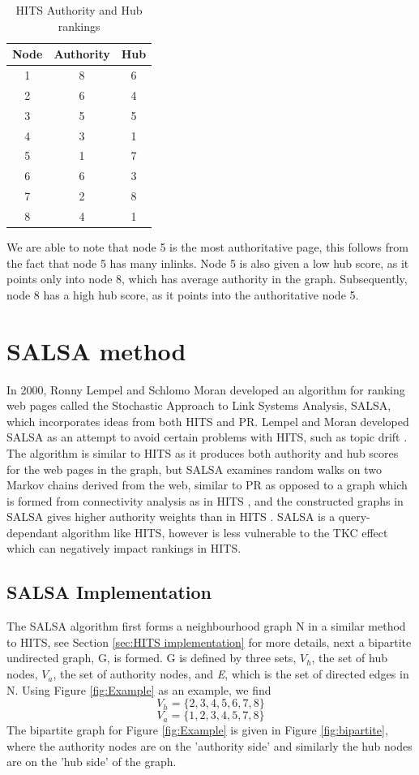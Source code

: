 \documentclass[11pt]{report}
\begin{document}
\begin{table}[h] \caption{HITS Authority and Hub rankings}
 \centering
 \begin{tabular} {c| c c} 
 Node & Authority & Hub \\ [0.5ex] 
 \hline
 1&8&6\\
 2&6&4\\
 3&5&5\\
 4&3&1\\
 5&1&7\\
 6&6&3\\
 7&2&8\\
 8&4&1\\
 \end{tabular}
 \label{Table:HITS}
\end{table} 

We are able to note that node 5 is the most authoritative page, this follows from the fact that node 5 has many inlinks. Node 5 is also given a low hub score, as it points only into node 8, which has average authority in the graph. Subsequently, node 8 has a high hub score, as it points into the authoritative node 5.
 
\section{SALSA method} \label{sec:SALSA}
In 2000, Ronny Lempel and Schlomo Moran developed an algorithm for ranking web pages called the Stochastic Approach to Link Systems Analysis, SALSA, which incorporates ideas from both HITS and PR. Lempel and Moran developed SALSA as an attempt to avoid certain problems with HITS, such as topic drift \cite{bonato}. The algorithm is similar to HITS as it produces both authority and hub scores for the web pages in the graph, but SALSA examines random walks on two Markov chains derived from the web, similar to PR as opposed to a graph which is formed from connectivity analysis as in HITS \cite{lempel2000stochastic}, and the constructed graphs in SALSA gives higher authority weights than in HITS \cite{bonato}. SALSA is a query-dependant algorithm like HITS, however is less vulnerable to the TKC effect which can negatively impact rankings in HITS.

\subsection{SALSA Implementation}\label{sec:SALSA implementation}
The SALSA algorithm first forms a neighbourhood graph N in a similar method to HITS, see Section \ref{sec:HITS implementation} for more details, next a bipartite undirected graph, G, is formed. G is defined by three sets, $V_h$, the set of hub nodes, $V_a$, the set of authority nodes, and \textit{E}, which is the set of directed edges in N. Using Figure \ref{fig:Example} as an example, we find 
\[V_h = \{2,3,4,5,6,7,8\} \]
\[V_a = \{1,2,3,4,5,7,8\} \]
The bipartite graph for Figure \ref{fig:Example} is given in Figure \ref{fig:bipartite}, where the authority nodes are on the 'authority side' and similarly the hub nodes are on the 'hub side' of the graph. 
\end{document}
